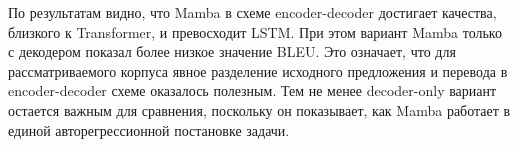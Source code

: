 По результатам видно, что Mamba в схеме encoder-decoder достигает качества, близкого к Transformer, и превосходит LSTM.
При этом вариант Mamba только с декодером показал более низкое значение BLEU.
Это означает, что для рассматриваемого корпуса явное разделение исходного предложения и перевода в encoder-decoder схеме оказалось полезным.
Тем не менее decoder-only вариант остается важным для сравнения, поскольку он показывает, как Mamba работает в единой авторегрессионной постановке задачи.
